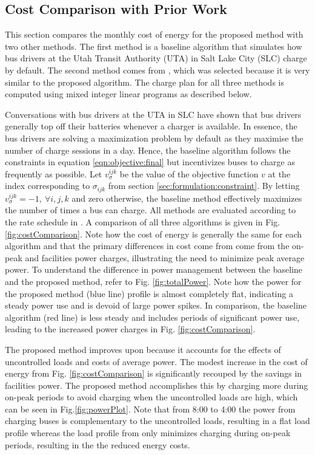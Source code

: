 \subsection{Cost Comparison with Prior Work\label{sec:results:prior}} 
This section compares the monthly cost of energy for the proposed method with two other methods. The first method is a baseline algorithm that simulates how bus drivers at the Utah Transit Authority (UTA) in Salt Lake City (SLC) charge by default. The second method comes from \cite{He_2019_Fast}, which was selected because it is very similar to the proposed algorithm. The charge plan for all three methods is computed using mixed integer linear programs as described below.  
\par Conversations with bus drivers at the UTA in SLC have shown that bus drivers generally top off their batteries whenever a charger is available. In essence, the bus drivers are solving a maximization problem by default as they maximise the number of charge sessions in a day. Hence, the baseline algorithm follows the constraints in equation \ref{eqn:objective:final} but incentivizes buses to charge as frequently as possible. Let $v_{\sigma}^{ijk}$ be the value of the objective function $v$ at the index corresponding to $\sigma_{ijk}$ from section \ref{sec:formulation:constraint}. By letting $v^{ijk}_{\sigma} = -1, \ \forall i,j,k$ and zero otherwise, the baseline method effectively maximizes the number of times a bus can charge.  
 All methods are evaluated according to the rate schedule in \cite{rocky_mountain_power_rocky_2021}. A comparison of all three algorithms is given in Fig. \ref{fig:costComparison}. Note how the cost of energy is generally the same for each algorithm and that the primary differences in cost come from come from the on-peak and facilities power charges, illustrating the need to minimize peak average power. To understand the difference in power management between the baseline and the proposed method, refer to Fig. \ref{fig:totalPower}. Note how the power for the proposed method (blue line) profile is almost completely flat, indicating a steady power use and is devoid of large power spikes. In comparison, the baseline algorithm (red line) is less steady and includes periods of significant power use, leading to the increased power charges in Fig. \ref{fig:costComparison}.
\par The proposed method improves upon \cite{He_2019_Fast} because it accounts for the effects of uncontrolled loads and costs of average power. The modest increase in the cost of energy from Fig. \ref{fig:costComparison} is significantly recouped by the savings in facilities power. The proposed method accomplishes this by charging more during on-peak periods to avoid charging when the uncontrolled loads are high, which can be seen in Fig.\ref{fig:powerPlot}. Note that from 8:00 to 4:00 the power from charging buses is complementary to the uncontrolled loads, resulting in a flat load profile whereas the load profile from \cite{He_2019_Fast} only minimizes charging during on-peak periods, resulting in the the reduced energy costs. 
